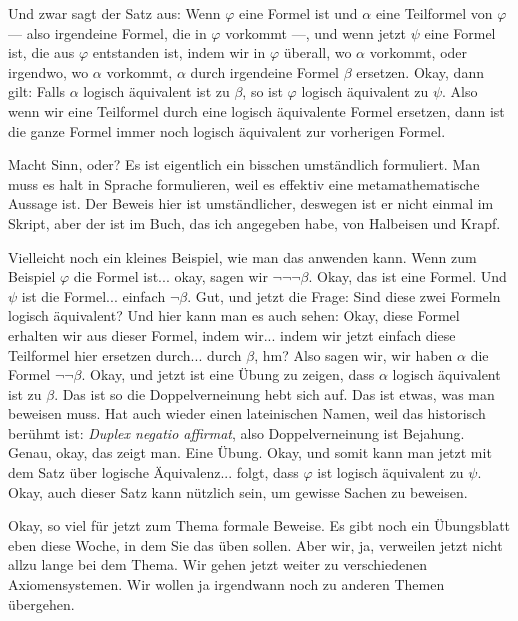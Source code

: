 \begin{spoken-clean}[01:13:09 - 01:15:30]
Und zwar sagt der Satz aus: Wenn $\varphi$ eine Formel ist und $\alpha$ eine Teilformel von $\varphi$ --- also irgendeine Formel, die in $\varphi$ vorkommt ---, und wenn jetzt $\psi$ eine Formel ist, die aus $\varphi$ entstanden ist, indem wir in $\varphi$ überall, wo $\alpha$ vorkommt, oder irgendwo, wo $\alpha$ vorkommt, $\alpha$ durch irgendeine Formel $\beta$ ersetzen. Okay, dann gilt: Falls $\alpha$ logisch äquivalent ist zu $\beta$, so ist $\varphi$ logisch äquivalent zu $\psi$. Also wenn wir eine Teilformel durch eine logisch äquivalente Formel ersetzen, dann ist die ganze Formel immer noch logisch äquivalent zur vorherigen Formel.

Macht Sinn, oder? Es ist eigentlich ein bisschen umständlich formuliert. Man muss es halt in Sprache formulieren, weil es effektiv eine metamathematische Aussage ist. Der Beweis hier ist umständlicher, deswegen ist er nicht einmal im Skript, aber der ist im Buch, das ich angegeben habe, von Halbeisen und Krapf.

Vielleicht noch ein kleines Beispiel, wie man das anwenden kann. Wenn zum Beispiel $\varphi$ die Formel ist... okay, sagen wir $\neg \neg \neg \beta$. Okay, das ist eine Formel. Und $\psi$ ist die Formel... einfach $\neg \beta$. Gut, und jetzt die Frage: Sind diese zwei Formeln logisch äquivalent? Und hier kann man es auch sehen: Okay, diese Formel erhalten wir aus dieser Formel, indem wir... indem wir jetzt einfach diese Teilformel hier ersetzen durch... durch $\beta$, hm? Also sagen wir, wir haben $\alpha$ die Formel $\neg \neg \beta$. Okay, und jetzt ist eine Übung zu zeigen, dass $\alpha$ logisch äquivalent ist zu $\beta$. Das ist so die Doppelverneinung hebt sich auf. Das ist etwas, was man beweisen muss. Hat auch wieder einen lateinischen Namen, weil das historisch berühmt ist: \emph{Duplex negatio affirmat}, also Doppelverneinung ist Bejahung. Genau, okay, das zeigt man. Eine Übung. Okay, und somit kann man jetzt mit dem Satz über logische Äquivalenz... folgt, dass $\varphi$ ist logisch äquivalent zu $\psi$. Okay, auch dieser Satz kann nützlich sein, um gewisse Sachen zu beweisen.
\end{spoken-clean}

\begin{spoken-clean}[01:18:24 - 01:19:00]
Okay, so viel für jetzt zum Thema formale Beweise. Es gibt noch ein Übungsblatt eben diese Woche, in dem Sie das üben sollen. Aber wir, ja, verweilen jetzt nicht allzu lange bei dem Thema. Wir gehen jetzt weiter zu verschiedenen Axiomensystemen. Wir wollen ja irgendwann noch zu anderen Themen übergehen.
\end{spoken-clean}

